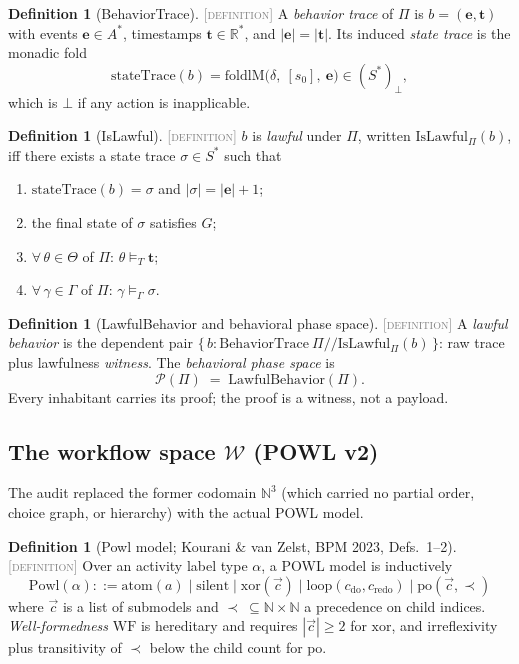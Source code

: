 \documentclass[11pt]{article}
\newcommand{\DEFINITION}{\textcolor{gray}{\textsc{[definition]}}}
\newcommand{\PT}{\Pi}                          %
\newcommand{\PS}{\mathcal{P}(\PT)}             %
\newcommand{\WS}{\mathcal{W}}                  %
\newcommand{\R}{\mathbb{R}}
\newcommand{\N}{\mathbb{N}}
\theoremstyle{plain}
\theoremstyle{definition}
\newtheorem{definition}[theorem]{Definition}
\begin{document}
\begin{definition}[BehaviorTrace]\DEFINITION\;
A \emph{behavior trace} of $\PT$ is
$b = (\mathbf{e}, \mathbf{t})$ with events $\mathbf{e} \in A^{*}$,
timestamps $\mathbf{t} \in \R^{*}$, and $|\mathbf{e}| = |\mathbf{t}|$.
Its induced \emph{state trace} is the monadic fold
\[
  \mathrm{stateTrace}(b) =
  \mathrm{foldlM}\big(\delta,\ [s_0],\ \mathbf{e}\big) \in (S^{*})_\bot ,
\]
which is $\bot$ if any action is inapplicable.
\end{definition}

\begin{definition}[IsLawful]\DEFINITION\;
$b$ is \emph{lawful} under $\PT$, written $\mathrm{IsLawful}_\PT(b)$, iff
there exists a state trace $\sigma \in S^{*}$ such that
\begin{enumerate}[nosep,label=(\roman*)]
  \item $\mathrm{stateTrace}(b) = \sigma$ and $|\sigma| = |\mathbf{e}| + 1$;
  \item the final state of $\sigma$ satisfies $G$;
  \item $\forall\, \theta \in \Theta$ of $\PT$: $\theta \models_T \mathbf{t}$;
  \item $\forall\, \gamma \in \Gamma$ of $\PT$: $\gamma \models_\Gamma \sigma$.
\end{enumerate}
\end{definition}

\begin{definition}[LawfulBehavior and behavioral phase space]\DEFINITION\;
A \emph{lawful behavior} is the dependent pair
$\{\, b : \mathrm{BehaviorTrace}\ \PT \mathrel{/\!/} \mathrm{IsLawful}_\PT(b) \,\}$:
raw trace plus lawfulness \emph{witness}. The
\emph{behavioral phase space} is
\[
  \PS \;=\; \mathrm{LawfulBehavior}(\PT).
\]
Every inhabitant carries its proof; the proof is a witness, not a payload.
\end{definition}

\subsection{The workflow space $\WS$ (POWL v2)}

The audit replaced the former codomain $\N^3$ (which carried no partial
order, choice graph, or hierarchy) with the actual POWL model.

\begin{definition}[Powl model; Kourani \& van Zelst, BPM 2023, Defs.~1--2]
\DEFINITION\;
Over an activity label type $\alpha$, a POWL model is inductively
\[
  \mathrm{Powl}(\alpha) ::=
  \mathrm{atom}(a) \mid
  \mathrm{silent} \mid
  \mathrm{xor}(\vec{c}) \mid
  \mathrm{loop}(c_{\mathrm{do}}, c_{\mathrm{redo}}) \mid
  \mathrm{po}(\vec{c}, \prec)
\]
where $\vec{c}$ is a list of submodels and
$\prec\ \subseteq \N \times \N$ a precedence on child indices.
\emph{Well-formedness} $\mathrm{WF}$ is hereditary and requires
$|\vec{c}| \ge 2$ for $\mathrm{xor}$, and irreflexivity plus transitivity of
$\prec$ below the child count for $\mathrm{po}$.
\end{definition}
\end{document}
